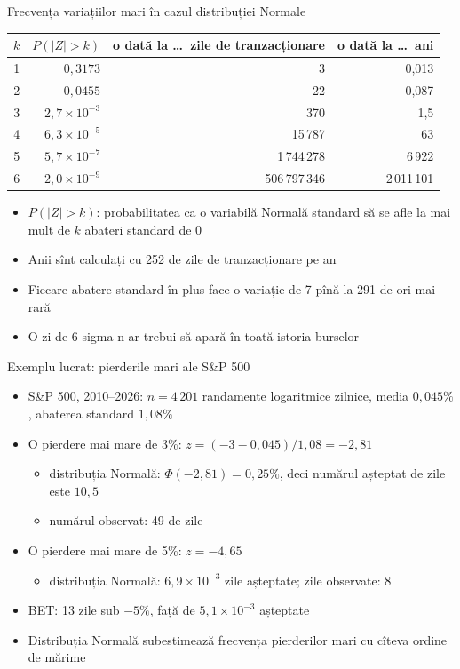 \begin{frame}{Frecvența variațiilor mari în cazul distribuției Normale}
\itemsize{\small}
\begin{center}
\footnotesize
\begin{tabular}{crrr}
\toprule
$k$ & $P(|Z| > k)$ & o dată la \dots\ zile de tranzacționare & o dată la \dots\ ani \\
\midrule
1 & ${0{,}3173}$ & 3 & 0{,}013 \\
2 & ${0{,}0455}$ & 22 & 0{,}087 \\
3 & ${2{,}7 \times 10^{-3}}$ & 370 & 1{,}5 \\
4 & ${6{,}3 \times 10^{-5}}$ & 15\,787 & 63 \\
5 & ${5{,}7 \times 10^{-7}}$ & 1\,744\,278 & 6\,922 \\
6 & ${2{,}0 \times 10^{-9}}$ & 506\,797\,346 & 2\,011\,101 \\
\bottomrule
\end{tabular}
\end{center}
\begin{itemize}
    \item $P(|Z| > k)$: probabilitatea ca o variabilă Normală standard să se afle la mai mult de $k$ abateri standard de 0
    \item Anii sînt calculați cu 252 de zile de tranzacționare pe an
    \item Fiecare abatere standard în plus face o variație de 7 pînă la 291 de ori mai rară
    \item O zi de 6 sigma n-ar trebui să apară în toată istoria burselor
\end{itemize}
\end{frame}

\begin{frame}{Exemplu lucrat: pierderile mari ale S\&P 500}
\itemsize{\footnotesize}
\begin{itemize}
    \item S\&P 500, 2010--2026: $n = 4\,201$ randamente logaritmice zilnice, media $0{,}045\%$, abaterea standard $1{,}08\%$
    \item O pierdere mai mare de 3\%: $z = (-3 - 0{,}045)/1{,}08 = -2{,}81$
    \begin{itemize}
        \item distribuția Normală: $\Phi(-2{,}81) = 0{,}25\%$, deci numărul așteptat de zile este $10{,}5$
        \item numărul observat: 49 de zile
    \end{itemize}
    \item O pierdere mai mare de 5\%: $z = -4{,}65$
    \begin{itemize}
        \item distribuția Normală: $6{,}9 \times 10^{-3}$ zile așteptate; zile observate: 8
    \end{itemize}
    \item BET: 13 zile sub $-5\%$, față de $5{,}1 \times 10^{-3}$ așteptate
    \item Distribuția Normală subestimează frecvența pierderilor mari cu cîteva ordine de mărime
\end{itemize}
\end{frame}

